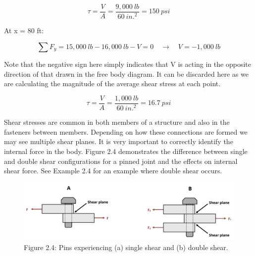 \documentclass[
  letterpaper,
  DIV=11,
  numbers=noendperiod]{scrreprt}
\begin{document}
\begin{tcolorbox}
\begin{tcolorbox}
\[
\tau=\frac{V}{A}=\frac{9,000{~lb}}{60{~in.}^2}=150{~psi}
\]

At x = 80 ft:

\[
\sum F_y=15,000{~lb}-16,000{~lb}-V=0 \quad \rightarrow \quad V=-1,000{~lb}
\]

Note that the negative sign here simply indicates that V is acting in
the opposite direction of that drawn in the free body diagram. It can be
discarded here as we are calculating the magnitude of the average shear
stress at each point.

\[
\tau=\frac{V}{A}=\frac{1,000{~lb}}{60{~in.}^2}=16.7{~psi}
\]

\end{tcolorbox}

\end{tcolorbox}

Shear stresses are common in both members of a structure and also in the
fasteners between members. Depending on how these connections are formed
we may see multiple shear planes. It is very important to correctly
identify the internal force in the body. Figure 2.4 demonstrates the
difference between single and double shear configurations for a pinned
joint and the effects on internal shear force. See Example 2.4 for an
example where double shear occurs.

\begin{figure}[H]

{\centering \includegraphics{images/CH2 figures/2.4.png}

}

\caption{Figure 2.4: Pins experiencing (a) single shear and (b) double
shear.}

\end{figure}%
\end{document}
